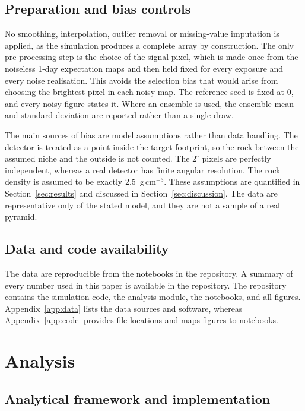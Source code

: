 \documentclass{article}
\begin{document}
\subsection{Preparation and bias controls}

No smoothing, interpolation, outlier removal or missing-value imputation is
applied, as the simulation produces a complete array by construction. The only
pre-processing step is the choice of the signal pixel, which is made once from
the noiseless 1-day expectation maps and then held fixed for every exposure and
every noise realisation. This avoids the selection bias that would arise from
choosing the brightest pixel in each noisy map. The reference seed is fixed at
0, and every noisy figure states it. Where an ensemble is used, the ensemble
mean and standard deviation are reported rather than a single draw.

The main sources of bias are model assumptions rather than data handling. The
detector is treated as a point inside the target footprint, so the rock between
the assumed niche and the outside is not counted. The $2^\circ$ pixels are
perfectly independent, whereas a real detector has finite angular resolution.
The rock density is assumed to be exactly 2.5~g\,cm$^{-3}$. These assumptions
are quantified in Section~\ref{sec:results} and discussed in
Section~\ref{sec:discussion}. The data are representative only of the stated
model, and they are not a sample of a real pyramid.

\subsection{Data and code availability}

The data are reproducible from the notebooks in the repository. A summary of
every number used in this paper is available in the repository. The repository
contains the simulation code, the analysis module, the notebooks, and all
figures. Appendix~\ref{app:data} lists the data sources and software, whereas
Appendix~\ref{app:code} provides file locations and maps figures to notebooks.


\section{Analysis}
\label{sec:analysis}

\subsection{Analytical framework and implementation}
\end{document}
